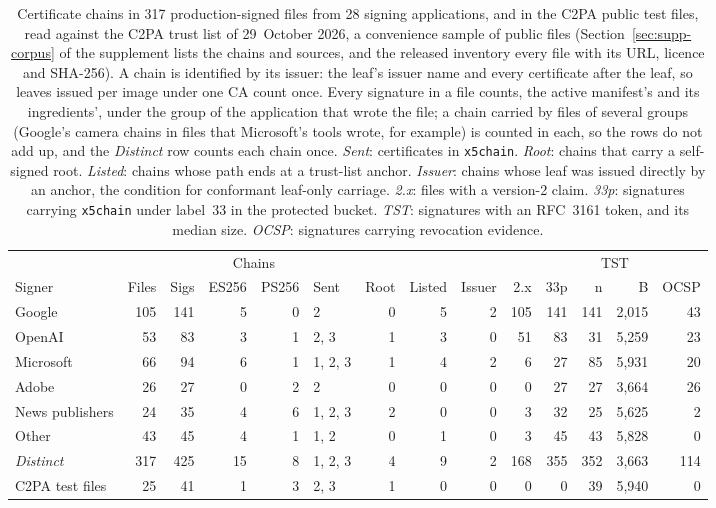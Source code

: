 \begin{table}[t]
\caption{Certificate chains in 317 production-signed files from 28 signing applications, and in the C2PA public test files, read against the C2PA trust list of 29~October 2026, a convenience sample of public files (Section~\ref{sec:supp-corpus} of the supplement lists the chains and sources, and the released inventory every file with its URL, licence and SHA-256). A chain is identified by its issuer: the leaf's issuer name and every certificate after the leaf, so leaves issued per image under one CA count once. Every signature in a file counts, the active manifest's and its ingredients', under the group of the application that wrote the file; a chain carried by files of several groups (Google's camera chains in files that Microsoft's tools wrote, for example) is counted in each, so the rows do not add up, and the \emph{Distinct} row counts each chain once. \emph{Sent}: certificates in \texttt{x5chain}. \emph{Root}: chains that carry a self-signed root. \emph{Listed}: chains whose path ends at a trust-list anchor. \emph{Issuer}: chains whose leaf was issued directly by an anchor, the condition for conformant leaf-only carriage. \emph{2.x}: files with a version-2 claim. \emph{33p}: signatures carrying \texttt{x5chain} under label~33 in the protected bucket. \emph{TST}: signatures with an RFC~3161 token, and its median size. \emph{OCSP}: signatures carrying revocation evidence.}
\label{tab:corpus}
\footnotesize
\setlength{\tabcolsep}{3.1pt}
\begin{tabular}{lrrrrlrrrrrrrr}
\toprule
 & & & \multicolumn{2}{c}{Chains} & & & & & & & \multicolumn{2}{c}{TST} & \\
\cmidrule(lr){4-5}\cmidrule(lr){12-13}
Signer & Files & Sigs & ES256 & PS256 & Sent & Root & Listed & Issuer & 2.x & 33p & n & B & OCSP\\
\midrule
Google & 105 & 141 & 5 & 0 & 2 & 0 & 5 & 2 & 105 & 141 & 141 & 2,015 & 43\\
OpenAI & 53 & 83 & 3 & 1 & 2, 3 & 1 & 3 & 0 & 51 & 83 & 31 & 5,259 & 23\\
Microsoft & 66 & 94 & 6 & 1 & 1, 2, 3 & 1 & 4 & 2 & 6 & 27 & 85 & 5,931 & 20\\
Adobe & 26 & 27 & 0 & 2 & 2 & 0 & 0 & 0 & 0 & 27 & 27 & 3,664 & 26\\
News publishers & 24 & 35 & 4 & 6 & 1, 2, 3 & 2 & 0 & 0 & 3 & 32 & 25 & 5,625 & 2\\
Other & 43 & 45 & 4 & 1 & 1, 2 & 0 & 1 & 0 & 3 & 45 & 43 & 5,828 & 0\\
\midrule
\emph{Distinct} & 317 & 425 & 15 & 8 & 1, 2, 3 & 4 & 9 & 2 & 168 & 355 & 352 & 3,663 & 114\\
\midrule
C2PA test files & 25 & 41 & 1 & 3 & 2, 3 & 1 & 0 & 0 & 0 & 0 & 39 & 5,940 & 0\\
\bottomrule
\end{tabular}
\end{table}
